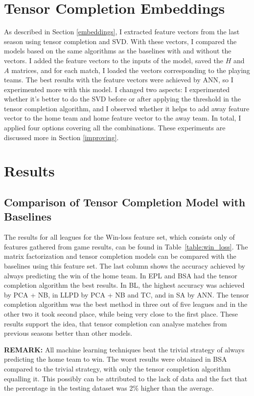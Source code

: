 \documentclass[thesis=M,english]{FITthesis}[2019/12/23]
\begin{document}
\section{Tensor Completion Embeddings}
\label{vectors}
As described in Section \ref{embeddings}, I extracted feature vectors from the last season using tensor completion and SVD. With these vectors, I compared the models based on the same algorithms as the baselines with and without the vectors. I added the feature vectors to the inputs of the model, saved the $H$ and $A$ matrices, and for each match, I loaded the vectors corresponding to the playing teams. The best results with the feature vectors were achieved by ANN, so I experimented more with this model. I changed two aspects: I experimented whether it's better to do the SVD before or after applying the threshold in the tensor completion algorithm, and I observed whether it helps to add away feature vector to the home team and home feature vector to the away team. In total, I applied four options covering all the combinations. These experiments are discussed more in Section \ref{improving}.

\section{Results}

\subsection{Comparison of Tensor Completion Model with Baselines}
The results for all leagues for the Win-loss feature set, which consists only of features gathered from game results, can be found in Table~\ref{table:win_loss}. The matrix factorization and tensor completion models can be compared with the baselines using this feature set. The last column shows the accuracy achieved by always predicting the win of the home team. In EPL and BSA had the tensor completion algorithm the best results. In BL, the highest accuracy was achieved by PCA + NB, in LLPD by PCA + NB and TC, and in SA by ANN. The tensor completion algorithm was the best method in three out of five leagues and in the other two it took second place, while being very close to the first place. These results support the idea, that tensor completion can analyse matches from previous seasons better than other models.

\noindent \textbf{REMARK:} All machine learning techniques beat the trivial strategy of always predicting the home team to win. The worst results were obtained in BSA compared to the trivial strategy, with only the tensor completion algorithm equalling it. This possibly can be attributed to the lack of data and the fact that the percentage in the testing dataset was 2\% higher than the average.
\end{document}
